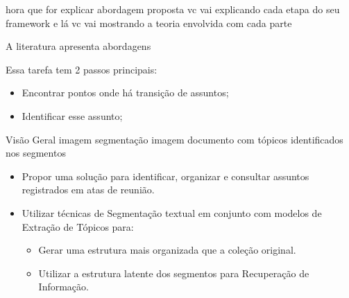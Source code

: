 hora que for explicar abordagem proposta
vc vai explicando cada etapa do seu framework
e lá vc vai mostrando a teoria envolvida com cada parte












A literatura apresenta abordagens 


Essa tarefa tem 2 passos principais:
\begin{itemize}
	\item Encontrar pontos onde há transição de assuntos;
	\item Identificar esse assunto;
\end{itemize}







Visão Geral 
imagem segmentação 
imagem documento com tópicos identificados nos segmentos








\begin{itemize}
	\item Propor uma solução para identificar, organizar e consultar assuntos registrados em atas de reunião.  
	\item Utilizar técnicas de Segmentação textual em conjunto com modelos de Extração de Tópicos para:
			\begin{itemize}
	\item Gerar uma estrutura mais organizada que a coleção original.
	\item Utilizar a estrutura latente dos segmentos para Recuperação de Informação. 
		\end{itemize}
\end{itemize}










